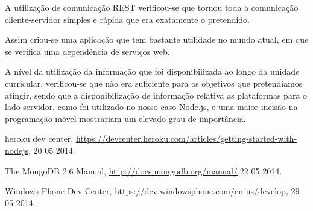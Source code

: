 \documentclass[12pt]{article}
\begin{document}
A utilização de comunicação REST verificou-se que tornou toda a comunicação cliente-servidor simples e rápida que era exatamente o pretendido.

Assim criou-se uma aplicação que tem bastante utilidade no mundo atual, em que se verifica uma dependência de serviços web.

A nível da utilização da informação que foi disponibilizada ao longo da unidade curricular, verificou-se que não era suficiente para os objetivos que pretendiamos atingir, sendo que a disponibilização de informação relativa as plataformas para o lado servidor, como foi utilizado no nosso caso Node.js, e uma maior incisão na programação móvel mostrariam um elevado grau de importância. 
\begin{thebibliography}{1}

heroku dev center, \url{https://devcenter.heroku.com/articles/getting-started-with-nodejs}, 20 05 2014.

The MongoDB 2.6 Manual, \url{http://docs.mongodb.org/manual/},22 05 2014.

Windows Phone Dev Center, \url{https://dev.windowsphone.com/en-us/develop}, 29 05 2014.

\end{thebibliography}
\end{document}
